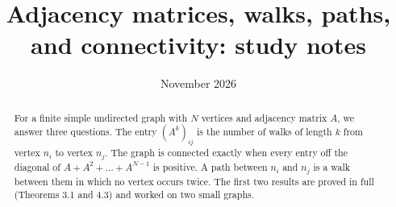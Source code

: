 \documentclass[11pt,a4paper]{article}
\title{Adjacency matrices, walks, paths, and connectivity: study notes}
\author{}
\date{November 2026}
\theoremstyle{definition}
\theoremstyle{plain}
\theoremstyle{remark}
\theoremstyle{plain}
\begin{document}
\maketitle

\begin{abstract}
For a finite simple undirected graph with $N$ vertices and adjacency matrix $A$, we answer three questions. The entry $(A^k)_{ij}$ is the number of walks of length $k$ from vertex $n_i$ to vertex $n_j$. The graph is connected exactly when every entry off the diagonal of $A + A^2 + \dots + A^{N-1}$ is positive. A path between $n_i$ and $n_j$ is a walk between them in which no vertex occurs twice. The first two results are proved in full (Theorems 3.1 and 4.3) and worked on two small graphs.
\end{abstract}









\printbibliography
\end{document}
